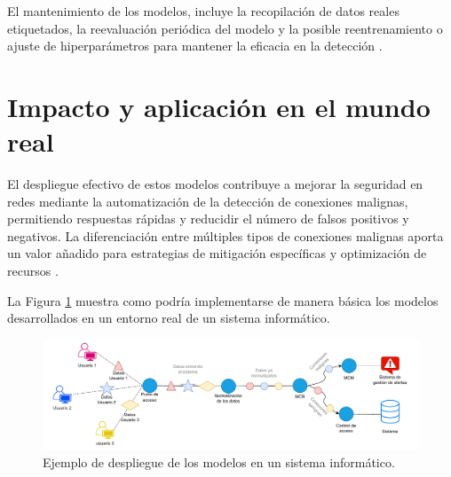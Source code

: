 El mantenimiento de los modelos, incluye la recopilación de datos reales etiquetados, la reevaluación periódica del modelo y la posible reentrenamiento o ajuste de hiperparámetros para mantener la eficacia en la detección \cite{tsymbal2004problem}.

\section{Impacto y aplicación en el mundo real}

El despliegue efectivo de estos modelos contribuye a mejorar la seguridad en redes mediante la automatización de la detección de conexiones malignas, permitiendo respuestas rápidas y reducidir el número de falsos positivos y negativos. La diferenciación entre múltiples tipos de conexiones malignas aporta un valor añadido para estrategias de mitigación específicas y optimización de recursos \cite{amershi2019software}.

La Figura \ref{fig:despliegue} muestra como podría implementarse de manera básica los modelos desarrollados en un entorno real de un sistema informático.

\begin{figure}[H]
    \centering
    \includegraphics[width=1\textwidth]{./img/despliegue/despliegue.pdf}
    \caption{Ejemplo de despliegue de los modelos en un sistema informático.}
    \label{fig:despliegue}
\end{figure}

